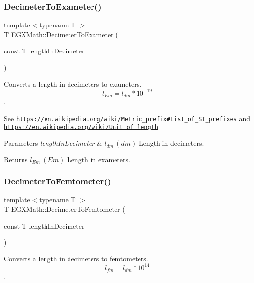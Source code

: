 \subsubsection{\texorpdfstring{Decimeter\+To\+Exameter()}{DecimeterToExameter()}}
{\footnotesize\ttfamily template$<$typename T $>$ \\
T E\+G\+X\+Math\+::\+Decimeter\+To\+Exameter (\begin{DoxyParamCaption}\item[{const T}]{length\+In\+Decimeter }\end{DoxyParamCaption})}



Converts a length in decimeters to exameters. \[ l_{Em}=l_{dm} * 10^{-19} \]. 

See \href{https://en.wikipedia.org/wiki/Metric_prefix#List_of_SI_prefixes}{\tt https\+://en.\+wikipedia.\+org/wiki/\+Metric\+\_\+prefix\#\+List\+\_\+of\+\_\+\+S\+I\+\_\+prefixes} and \href{https://en.wikipedia.org/wiki/Unit_of_length}{\tt https\+://en.\+wikipedia.\+org/wiki/\+Unit\+\_\+of\+\_\+length} 
\begin{DoxyParams}{Parameters}
{\em length\+In\+Decimeter} & $ l_{dm}\ (dm)$ Length in decimeters. \\
\hline
\end{DoxyParams}
\begin{DoxyReturn}{Returns}
$ l_{Em}\ (Em)$ Length in exameters. 
\end{DoxyReturn}
\mbox{\label{group___e_g_x_math-_conversions-_length_conversions-_s_i-_decimeter-_s_i_gab06170fbc8b349582e4ae34d41f3f706}} 
\subsubsection{\texorpdfstring{Decimeter\+To\+Femtometer()}{DecimeterToFemtometer()}}
{\footnotesize\ttfamily template$<$typename T $>$ \\
T E\+G\+X\+Math\+::\+Decimeter\+To\+Femtometer (\begin{DoxyParamCaption}\item[{const T}]{length\+In\+Decimeter }\end{DoxyParamCaption})}



Converts a length in decimeters to femtometers. \[ l_{fm}=l_{dm} * 10^{14} \]. 

